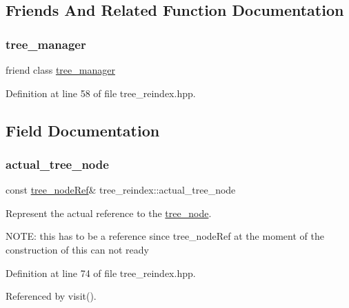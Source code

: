 \subsection{Friends And Related Function Documentation}
\mbox{\label{classtree__reindex_a254e84412a115167e85294af86ad8de7}} 
\subsubsection{\texorpdfstring{tree\+\_\+manager}{tree\_manager}}
{\footnotesize\ttfamily friend class \hyperlink{classtree__manager}{tree\+\_\+manager}\hspace{0.3cm}{\ttfamily [friend]}}



Definition at line 58 of file tree\+\_\+reindex.\+hpp.



\subsection{Field Documentation}
\mbox{\label{classtree__reindex_acee28e4416c0893072fbf88c3c4304a4}} 
\subsubsection{\texorpdfstring{actual\+\_\+tree\+\_\+node}{actual\_tree\_node}}
{\footnotesize\ttfamily const \hyperlink{tree__node_8hpp_a6ee377554d1c4871ad66a337eaa67fd5}{tree\+\_\+node\+Ref}\& tree\+\_\+reindex\+::actual\+\_\+tree\+\_\+node}



Represent the actual reference to the \hyperlink{classtree__node}{tree\+\_\+node}. 

N\+O\+TE\+: this has to be a reference since tree\+\_\+node\+Ref at the moment of the construction of this can not ready 

Definition at line 74 of file tree\+\_\+reindex.\+hpp.



Referenced by visit().

